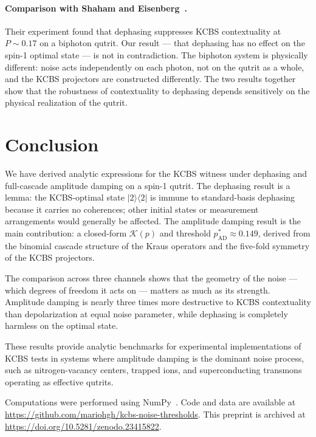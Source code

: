 \documentclass[twocolumn,showpacs,preprintnumbers,amsmath,amssymb,prl]{revtex4-2}
\newcommand{\ket}[1]{|#1\rangle}
\newcommand{\bra}[1]{\langle #1|}
\newcommand{\K}{\mathcal{K}}          %
\newcommand{\pstar}{p^{*}}            %
\begin{document}
\paragraph{Comparison with Shaham and Eisenberg~\cite{Shaham2014}.}
Their experiment found that dephasing suppresses KCBS contextuality at
$P \sim 0.17$ on a biphoton qutrit.
Our result --- that dephasing has no effect on the spin-1 optimal state ---
is not in contradiction.
The biphoton system is physically different: noise acts independently on each
photon, not on the qutrit as a whole, and the KCBS projectors are constructed
differently.
The two results together show that the robustness of contextuality to dephasing
depends sensitively on the physical realization of the qutrit.

\section{Conclusion}
\label{sec:conclusion}

We have derived analytic expressions for the KCBS witness under dephasing and
full-cascade amplitude damping on a spin-1 qutrit.
The dephasing result is a lemma: the KCBS-optimal state $\ket{2}\bra{2}$ is
immune to standard-basis dephasing because it carries no coherences; other
initial states or measurement arrangements would generally be affected.
The amplitude damping result is the main contribution: a closed-form $\K(p)$
and threshold $\pstar_{\mathrm{AD}} \approx 0.149$, derived from the binomial
cascade structure of the Kraus operators and the five-fold symmetry of the KCBS
projectors.

The comparison across three channels shows that the geometry of the noise ---
which degrees of freedom it acts on --- matters as much as its strength.
Amplitude damping is nearly three times more destructive to KCBS contextuality
than depolarization at equal noise parameter, while dephasing is completely
harmless on the optimal state.

These results provide analytic benchmarks for experimental implementations of
KCBS tests in systems where amplitude damping is the dominant noise process,
such as nitrogen-vacancy centers, trapped ions, and superconducting transmons
operating as effective qutrits.

\begin{acknowledgments}
Computations were performed using NumPy~\cite{NumPy2020}.
Code and data are available at \url{https://github.com/mariohgh/kcbs-noise-thresholds}.
This preprint is archived at \url{https://doi.org/10.5281/zenodo.23415822}.
\end{acknowledgments}


\end{document}
